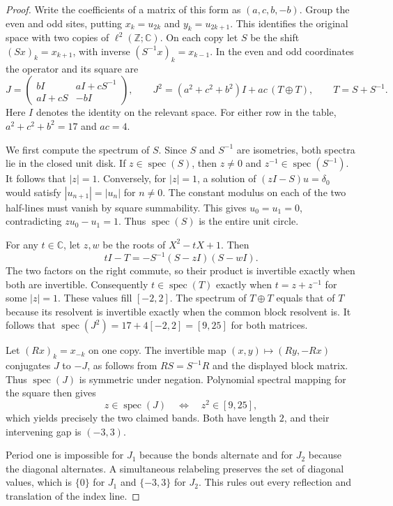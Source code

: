 \documentclass[11pt]{article}
\newcommand{\spec}{\operatorname{spec}}
\begin{document}
\begin{proof}
Write the coefficients of a matrix of this form as $(a,c,b,-b)$.
Group the even and odd sites, putting $x_k=u_{2k}$ and $y_k=u_{2k+1}$.
This identifies the original space with two copies of
$\ell^2(\mathbb Z;\mathbb C)$. On each copy let $S$ be the shift
$(Sx)_k=x_{k+1}$, with inverse $(S^{-1}x)_k=x_{k-1}$.
In the even and odd coordinates the operator and its square are
\[
 J=\begin{pmatrix}bI&aI+cS^{-1}\\aI+cS&-bI\end{pmatrix},
 \qquad
 J^2=(a^2+c^2+b^2)I+ac\,(T\oplus T),\qquad T=S+S^{-1}.
\]
Here $I$ denotes the identity on the relevant space. For either row
in the table, $a^2+c^2+b^2=17$ and $ac=4$.

We first compute the spectrum of $S$. Since $S$ and $S^{-1}$ are
isometries, both spectra lie in the closed unit disk. If
$z\in\spec(S)$, then $z\ne 0$ and $z^{-1}\in\spec(S^{-1})$.
It follows that $|z|=1$. Conversely, for $|z|=1$, a solution of
$(zI-S)u=\delta_0$ would satisfy
$|u_{n+1}|=|u_n|$ for $n\ne0$. The constant modulus on each of the
two half-lines must vanish by square summability. This gives
$u_0=u_1=0$, contradicting $z u_0-u_1=1$. Thus $\spec(S)$ is the
entire unit circle.

For any $t\in\mathbb C$, let $z,w$ be the roots of $X^2-tX+1$.
Then
\[
 tI-T=-S^{-1}(S-zI)(S-wI).
\]
The two factors on the right commute, so their product is invertible
exactly when both are invertible. Consequently $t\in\spec(T)$
exactly when $t=z+z^{-1}$ for some $|z|=1$. These values fill
$[-2,2]$. The spectrum of $T\oplus T$ equals that of $T$ because its
resolvent is invertible exactly when the common block resolvent is.
It follows that $\spec(J^2)=17+4[-2,2]=[9,25]$ for both matrices.

Let $(Rx)_k=x_{-k}$ on one copy. The invertible map
$(x,y)\mapsto(Ry,-Rx)$ conjugates $J$ to $-J$, as follows from
$RS=S^{-1}R$ and the displayed block matrix. Thus $\spec(J)$ is
symmetric under negation. Polynomial spectral mapping for the
square then gives
\[
 z\in\spec(J)\quad\Longleftrightarrow\quad z^2\in[9,25],
\]
which yields precisely the two claimed bands. Both have length $2$,
and their intervening gap is $(-3,3)$.

Period one is impossible for $J_1$ because the bonds alternate and
for $J_2$ because the diagonal alternates. A simultaneous
relabeling preserves the set of diagonal values, which is $\{0\}$
for $J_1$ and $\{-3,3\}$ for $J_2$. This rules out every reflection
and translation of the index line.
\end{proof}
\end{document}
